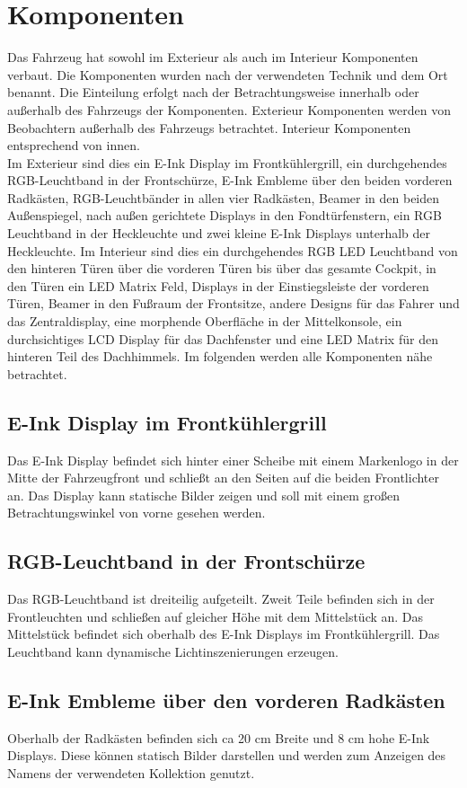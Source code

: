 \section{Komponenten}
Das Fahrzeug hat sowohl im Exterieur als auch im Interieur Komponenten verbaut. Die Komponenten wurden nach der verwendeten Technik und dem Ort benannt. Die Einteilung erfolgt nach der Betrachtungsweise innerhalb oder außerhalb des Fahrzeugs der Komponenten. Exterieur Komponenten werden von Beobachtern außerhalb des Fahrzeugs betrachtet. Interieur Komponenten entsprechend von innen.\\
Im Exterieur sind dies ein E-Ink Display im Frontkühlergrill, ein durchgehendes RGB-Leuchtband in der Frontschürze, E-Ink Embleme über den beiden vorderen Radkästen, RGB-Leuchtbänder in allen vier Radkästen, Beamer in den beiden Außenspiegel, nach außen gerichtete Displays in den Fondtürfenstern, ein RGB Leuchtband in der Heckleuchte und zwei kleine E-Ink Displays unterhalb der Heckleuchte.
Im Interieur sind dies ein durchgehendes RGB LED Leuchtband von den hinteren Türen über die vorderen Türen bis über das gesamte Cockpit, in den Türen ein LED Matrix Feld, Displays in der Einstiegsleiste der vorderen Türen, Beamer in den Fußraum der Frontsitze, andere Designs für das Fahrer und das Zentraldisplay, eine morphende Oberfläche in der Mittelkonsole, ein durchsichtiges LCD Display für das Dachfenster und eine LED Matrix für den hinteren Teil des Dachhimmels.
Im folgenden werden alle Komponenten nähe betrachtet.
\subsection{E-Ink Display im Frontkühlergrill}
Das E-Ink Display befindet sich hinter einer Scheibe mit einem Markenlogo in der Mitte der Fahrzeugfront und schließt an den Seiten auf die beiden Frontlichter an. Das Display kann statische Bilder zeigen und soll mit einem großen Betrachtungswinkel von vorne gesehen werden.
\subsection{RGB-Leuchtband in der Frontschürze}
Das RGB-Leuchtband ist dreiteilig aufgeteilt. Zweit Teile befinden sich in der Frontleuchten und schließen auf gleicher Höhe mit dem Mittelstück an. Das Mittelstück befindet sich oberhalb des E-Ink Displays im Frontkühlergrill. Das Leuchtband kann dynamische Lichtinszenierungen erzeugen.
\subsection{E-Ink Embleme über den vorderen Radkästen}
Oberhalb der Radkästen befinden sich ca 20 cm Breite und 8 cm hohe E-Ink Displays. Diese können statisch Bilder darstellen und werden zum Anzeigen des Namens der verwendeten Kollektion genutzt.

